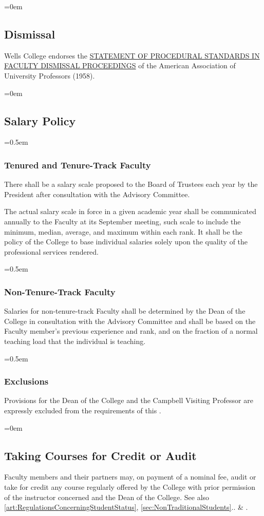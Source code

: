 \documentclass{manual}
\let\oldsubsection\subsection
\renewcommand\subsection{\leftskip=0em\oldsubsection}
\let\oldsubsubsection\subsubsection
\renewcommand\subsubsection{\leftskip=0.5em\oldsubsubsection}
\begin{document}
\subsection{Dismissal}\label{sec:Dismissal}
Wells College endorses the \href{http://www.aaup.org/AAUP/pubsres/policydocs/contents/statementon+proceduralstandardsinFaculty+dismissal+proceedings.htm}{STATEMENT OF PROCEDURAL STANDARDS IN FACULTY DISMISSAL PROCEEDINGS} of the American Association of University Professors (1958).

\subsection{Salary Policy}\label{sec:SalaryPolicy}

\subsubsection{Tenured and Tenure-Track Faculty}

There shall be a salary scale proposed to the Board of Trustees each year by the President after consultation with the Advisory Committee.

The actual salary scale in force in a given academic year shall be communicated annually to the Faculty at its September meeting, such scale to include the minimum, median, average, and maximum within each rank. It shall be the policy of the College to base individual salaries solely upon the quality of the professional services rendered. 

\subsubsection{Non-Tenure-Track Faculty}
Salaries for non-tenure-track Faculty shall be determined by the Dean of the College in consultation with the Advisory Committee and shall be based on the Faculty member's previous experience and rank, and on the fraction of a normal teaching load that the individual is teaching.

\subsubsection{Exclusions}
Provisions for the Dean of the College and the Campbell Visiting Professor are expressly excluded from the requirements of this .

\subsection{Taking Courses for Credit or Audit}
Faculty members and their partners may, on payment of a nominal fee, audit or take for credit any course regularly offered by the College with prior permission of the instructor concerned and the Dean of the College. See also \cref{art:RegulationsConcerningStudentStatus}, \cref{sec:NonTraditionalStudents}.. \& .
\end{document}
